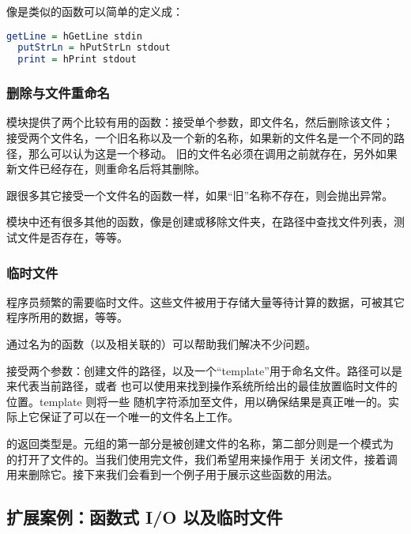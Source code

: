 \documentclass[./main.tex]{subfiles}
\begin{document}
像是类似的函数可以简单的定义成：

\begin{lstlisting}[language=Haskell]
  getLine = hGetLine stdin
  putStrLn = hPutStrLn stdout
  print = hPrint stdout
\end{lstlisting}

\subsubsection*{删除与文件重命名}

模块提供了两个比较有用的函数：接受单个参数，即文件名，然后删除该文件；
接受两个文件名，一个旧名称以及一个新的名称，如果新的文件名是一个不同的路径，那么可以认为这是一个移动。
旧的文件名必须在调用之前就存在，另外如果新文件已经存在，则重命名后将其删除。

跟很多其它接受一个文件名的函数一样，如果“旧”名称不存在，则会抛出异常。

模块中还有很多其他的函数，像是创建或移除文件夹，在路径中查找文件列表，测试文件是否存在，等等。

\subsubsection*{临时文件}

程序员频繁的需要临时文件。这些文件被用于存储大量等待计算的数据，可被其它程序所用的数据，等等。

通过名为的函数（以及相关联的）可以帮助我们解决不少问题。

接受两个参数：创建文件的路径，以及一个“template”用于命名文件。路径可以是来代表当前路径，或者
也可以使用来找到操作系统所给出的最佳放置临时文件的位置。template 则将一些
随机字符添加至文件，用以确保结果是真正唯一的。实际上它保证了可以在一个唯一的文件名上工作。

的返回类型是。元组的第一部分是被创建文件的名称，第二部分则是一个模式为
的打开了文件的。当我们使用完文件，我们希望用来操作用于
关闭文件，接着调用来删除它。接下来我们会看到一个例子用于展示这些函数的用法。

\subsection*{扩展案例：函数式 I/O 以及临时文件}

\end{document}
